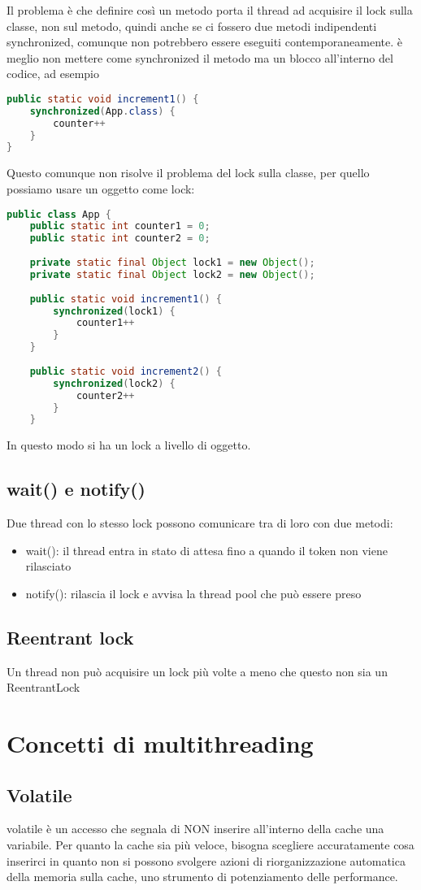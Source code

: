 \documentclass[11pt,a4paper]{book}
\begin{document}
Il problema è che definire così un metodo porta il thread ad acquisire il lock sulla classe, non sul metodo, quindi anche se ci fossero due metodi indipendenti synchronized, comunque non potrebbero essere eseguiti contemporaneamente. è meglio non mettere come synchronized il metodo ma un blocco all'interno del codice, ad esempio
\begin{lstlisting}[language = Java]
public static void increment1() {
	synchronized(App.class) {
		counter++
	}
}
\end{lstlisting}
Questo comunque non risolve il problema del lock sulla classe, per quello possiamo usare un oggetto come lock:
\begin{lstlisting}[language = Java]
public class App {
	public static int counter1 = 0;
	public static int counter2 = 0;
	
	private static final Object lock1 = new Object();
	private static final Object lock2 = new Object();
	
	public static void increment1() {
		synchronized(lock1) {
			counter1++
		}
	}
	
	public static void increment2() {
		synchronized(lock2) {
			counter2++
		}
	}
\end{lstlisting}
In questo modo si ha un lock a livello di oggetto.
\section{wait() e notify()}
Due thread con lo stesso lock possono comunicare tra di loro con due metodi:
\begin{itemize}
	\item wait(): il thread entra in stato di attesa fino a quando il token non viene rilasciato
	\item notify(): rilascia il lock e avvisa la thread pool che può essere preso
\end{itemize}

\section{Reentrant lock}
Un thread non può acquisire un lock più volte a meno che questo non sia un ReentrantLock

\chapter{Concetti di multithreading}
\section{Volatile}
volatile è un accesso che segnala di NON inserire all'interno della cache una variabile. Per quanto la cache sia più veloce, bisogna scegliere accuratamente cosa inserirci in quanto non si possono svolgere azioni di riorganizzazione automatica della memoria sulla cache, uno strumento di potenziamento delle performance.
\end{document}
